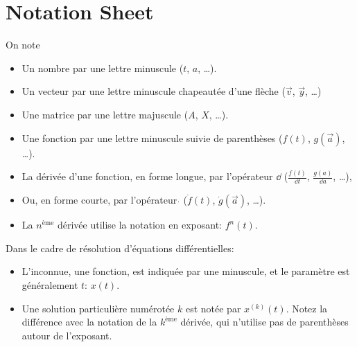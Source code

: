 \chapter{Notation Sheet}
On note
\begin{itemize}
    \item Un nombre par une lettre minuscule ($t$, $a$, \ldots).
    \item Un vecteur par une lettre minuscule chapeautée d'une flèche ($\overrightarrow{v}$, $\overrightarrow{y}$, \ldots)
    \item Une matrice par une lettre majuscule ($A$, $X$, \ldots).
    \item Une fonction par une lettre minuscule suivie de parenthèses ($f(t)$, $g(\overrightarrow{a})$, \ldots).
    \item La dérivée d'une fonction, en forme longue, par l'opérateur $\dd $ ($\frac{f(t)}{\dd t}$, $\frac{g(a)}{\dd a}$, \ldots), 
    \item Ou, en forme courte, par l'opérateur $\dot{}$ ($\dot{f}(t)$, $\dot{g}(\overrightarrow{a})$, \ldots).
    \item La $n^{\text{ème}}$ dérivée utilise la notation en exposant: $f^n(t)$.
\end{itemize}

Dans le cadre de résolution d'équations différentielles:
\begin{itemize}
    \item L'inconnue, une fonction, est indiquée par une minuscule, et le paramètre est généralement $t$: $x(t)$.
    \item Une solution particulière numérotée $k$ est notée par $x^{(k)}(t)$. Notez la différence avec la notation de la $k^{\text{ème}}$ dérivée, qui n'utilise pas de parenthèses autour de l'exposant.
\end{itemize}